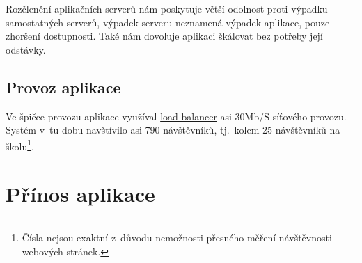 Rozčlenění aplikačních serverů nám poskytuje větší odolnost proti výpadku samostatných serverů, výpadek serveru neznamená výpadek aplikace, pouze zhoršení dostupnosti.
Také nám dovoluje aplikaci škálovat bez potřeby její odstávky.



\subsection{Provoz aplikace}

Ve špičce provozu aplikace \bso{} využíval \hyperref[sub:load-balancing]{load-balancer} asi 30\si{Mb/S} síťového provozu.
Systém v~tu dobu navštívilo asi 790 návštěvníků, tj.\ kolem 25 návštěvníků na školu\footnote{Čísla nejsou exaktní z~důvodu nemožnosti přesného měření návštěvnosti webových stránek.}.


\section{Přínos aplikace}


